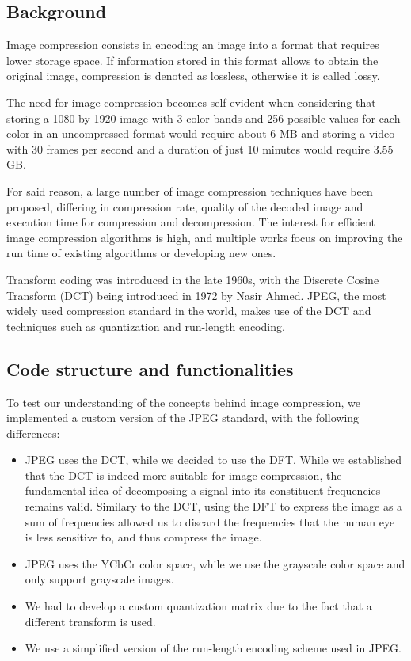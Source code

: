 \subsection{Background}
Image compression consists in encoding an image into a format that requires lower storage space. If information stored in this format allows to obtain the original image, compression is denoted as lossless, otherwise it is called lossy. 

The need for image compression becomes self-evident when considering that storing a 1080 by 1920 image with 3 color bands and 256 possible values for each color in an uncompressed format would require about 6 MB and storing a video with 30 frames per second and a duration of just 10 minutes would require 3.55 GB. 

For said reason, a large number of image compression techniques have been proposed\cite{compression_list_1}\cite{compression_list_2}\cite{compression_wavelet}, differing in compression rate, quality of the decoded image and execution time for compression and decompression. The interest for efficient image compression algorithms is high, and multiple works focus on improving the run time of existing algorithms or developing new ones\cite{compression_optimize_1}\cite{compression_optimize_2}.

Transform coding was introduced in the late 1960s, with the Discrete Cosine Transform (DCT) being introduced in 1972 by Nasir Ahmed\cite{dct}. JPEG\cite{jpeg}, the most widely used compression standard in the world\cite{jpeg_popular}, makes use of the DCT and techniques such as quantization and run-length encoding.

\subsection{Code structure and functionalities}
To test our understanding of the concepts behind image compression, we implemented a custom version of the JPEG standard, with the following differences:
\begin{itemize}
    \item JPEG uses the DCT, while we decided to use the DFT. While we established that the DCT is indeed more suitable for image compression, the fundamental idea of decomposing a signal into its constituent frequencies remains valid. Similary to the DCT, using the DFT to express the image as a sum of frequencies allowed us to discard the frequencies that the human eye is less sensitive to, and thus compress the image.
    \item JPEG uses the YCbCr color space, while we use the grayscale color space and only support grayscale images.
    \item We had to develop a custom quantization matrix due to the fact that a different transform is used.
    \item We use a simplified version of the run-length encoding scheme used in JPEG.
\end{itemize}

